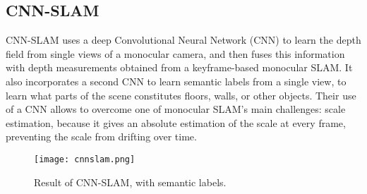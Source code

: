 \subsection{CNN-SLAM}
CNN-SLAM \cite{cnnslam} uses a deep Convolutional Neural Network (CNN) to learn the depth field from single views of a monocular camera, and then fuses this information with depth measurements obtained from a keyframe-based monocular SLAM. It also incorporates a second CNN to learn semantic labels from a single view, to learn what parts of the scene constitutes floors, walls, or other objects. Their use of a CNN allows to overcome one of monocular SLAM's main challenges: scale estimation, because it gives an absolute estimation of the scale at every frame, preventing the scale from drifting over time.

\begin{figure}[H]
  \centering
  \texttt{[image: cnnslam.png]}
    \caption{Result of CNN-SLAM, with semantic labels. \cite{cnnslam}}
    \label{fig:cnnslam}
\end{figure}
